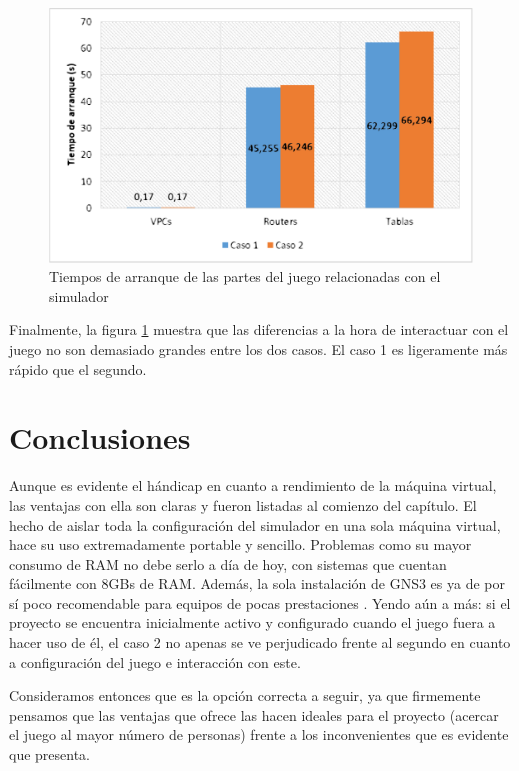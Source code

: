 \begin{figure}[H]
  \centering
  \includegraphics[scale=0.4]{imagenes/arranquejuego}
  \caption{Tiempos de arranque de las partes del juego relacionadas con el simulador}
  \label{fig:arranquejuego}
\end{figure}

Finalmente, la figura \ref{fig:arranquejuego} muestra que las diferencias a la hora de interactuar con el juego no son demasiado grandes entre los dos casos. El caso 1 es ligeramente más rápido que el segundo.

\section{Conclusiones}

Aunque es evidente el hándicap en cuanto a rendimiento de la máquina virtual, las ventajas con ella son claras y fueron listadas al comienzo del capítulo. El hecho de aislar toda la configuración del simulador en una sola máquina virtual, hace su uso extremadamente portable y sencillo. Problemas como su mayor consumo de RAM no debe serlo a día de hoy, con sistemas que cuentan fácilmente con 8GBs de RAM. Además, la sola instalación de GNS3 es ya de por sí poco recomendable para equipos de pocas prestaciones \cite{gnsweb}. Yendo aún a más: si el proyecto se encuentra inicialmente activo y configurado cuando el juego fuera a hacer uso de él, el caso 2 no apenas se ve perjudicado frente al segundo en cuanto a configuración del juego e interacción con este.

Consideramos entonces que es la opción correcta a seguir, ya que firmemente pensamos que las ventajas que ofrece las hacen ideales para el proyecto (acercar el juego al mayor número de personas) frente a los inconvenientes que es evidente que presenta.